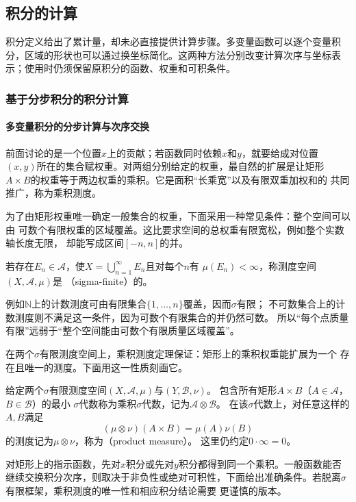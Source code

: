 \subsection{积分的计算}

积分定义给出了累计量，却未必直接提供计算步骤。多变量函数可以逐个变量积分，区域的形状也可以通过换坐标简化。这两种方法分别改变计算次序与坐标表示；使用时仍须保留原积分的函数、权重和可积条件。

\subsubsection{基于分步积分的积分计算}
\paragraph{多变量积分的分步计算与次序交换}

前面讨论的是一个位置$x$上的贡献；若函数同时依赖$x$和$y$，就要给成对位置
$(x,y)$所在的集合赋权重。对两组分别给定的权重，最自然的扩展是让矩形
$A\times B$的权重等于两边权重的乘积。它是面积“长乘宽”以及有限双重加权和的
共同推广，称为乘积测度。

为了由矩形权重唯一确定一般集合的权重，下面采用一种常见条件：整个空间可以由
可数个有限权重的区域覆盖。这比要求空间的总权重有限宽松，例如整个实数轴长度无限，
却能写成区间$[-n,n]$的并。
\begin{definition}
\label{def:analysis-sigma-finite-measure}
若存在$E_n\in\mathcal{A}$，使$X=\bigcup_{n=1}^{\infty}E_n$且对每个$n$有
$\mu(E_n)<\infty$，称测度空间$(X,\mathcal{A},\mu)$是
（sigma-finite）的。
\end{definition}
例如$\mathbb N$上的计数测度可由有限集合$\{1,\ldots,n\}$覆盖，因而$\sigma$有限；
不可数集合上的计数测度则不满足这一条件，因为可数个有限集合的并仍然可数。
所以“每个点质量有限”远弱于“整个空间能由可数个有限质量区域覆盖”。

在两个$\sigma$有限测度空间上，乘积测度定理保证：矩形上的乘积权重能扩展为一个
存在且唯一的测度。下面用这一性质刻画它。
\begin{definition}
\label{def:analysis-product-measure}
给定两个$\sigma$有限测度空间$(X,\mathcal{A},\mu)$与$(Y,\mathcal{B},\nu)$。
包含所有矩形$A\times B$（$A\in\mathcal{A}$，$B\in\mathcal{B}$）的最小
$\sigma$代数称为乘积$\sigma$代数，记为$\mathcal{A}\otimes\mathcal{B}$。
在该$\sigma$代数上，对任意这样的$A,B$满足
\[   (\mu\otimes\nu)(A\times B)=\mu(A)\nu(B) \]
的测度记为$\mu\otimes\nu$，称为（product measure）。
这里仍约定$0\cdot\infty=0$。
\end{definition}
对矩形上的指示函数，先对$x$积分或先对$y$积分都得到同一个乘积。一般函数能否继续交换积分次序，则取决于非负性或绝对可积性，下面给出准确条件。若脱离$\sigma$有限框架，乘积测度的唯一性和相应积分结论需要
更谨慎的版本。


